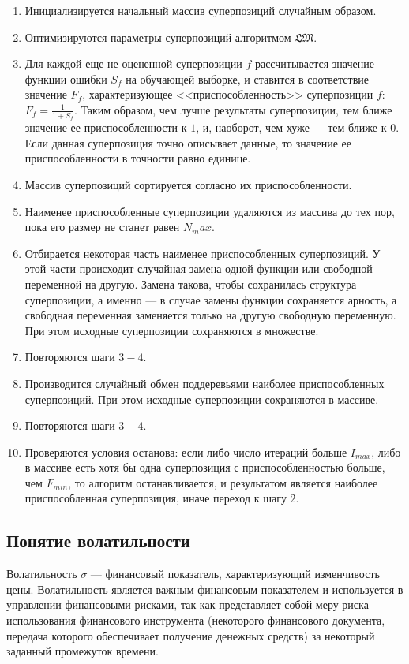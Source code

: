 \documentclass[12pt,a4paper]{amsart}
\begin{document}
\begin{enumerate}
  \item Инициализируется начальный массив суперпозиций случайным образом.
  \item Оптимизируются параметры суперпозиций алгоритмом $\mathfrak{LM}$.
  \item Для каждой еще не оцененной суперпозиции $f$ рассчитывается значение
	функции ошибки $S_f$ на обучающей выборке, и ставится в соответствие
	значение $F_f$, характеризующее <<приспособленность>> суперпозиции $f$:
	$F_f = \frac{1}{1 + S_f}$. Таким образом, чем лучше результаты суперпозиции,
	тем ближе значение ее приспособленности к $1$, и, наоборот, чем хуже ---
	тем ближе к $0$. Если данная суперпозиция точно описывает данные, то
	значение ее приспособленности в точности равно единице.
  \item Массив суперпозиций сортируется согласно их приспособленности.
  \item Наименее приспособленные суперпозиции удаляются из массива до тех
	пор, пока его размер не станет равен $N_max$.
  \item Отбирается некоторая часть наименее приспособленных суперпозиций.
	У этой части происходит случайная замена одной функции или свободной
	переменной на другую. Замена такова, чтобы сохранилась структура
	суперпозиции, а именно --- в случае замены функции сохраняется арность,
	а свободная переменная заменяется только на другую свободную переменную.
	При этом исходные суперпозиции сохраняются в множестве.
  \item Повторяются шаги $3-4$.
  \item Производится случайный обмен поддеревьями наиболее приспособленных
	суперпозиций. При этом исходные суперпозиции сохраняются в массиве.
  \item Повторяются шаги $3-4$.
  \item Проверяются условия останова: если либо число итераций больше
	$I_{max}$, либо в массиве есть хотя бы одна суперпозиция с
	приспособленностью больше, чем $F_{min}$, то алгоритм останавливается,
	и результатом является наиболее приспособленная суперпозиция, иначе
	переход к шагу $2$.
\end{enumerate}

\subsection{Понятие волатильности}

Волатильность $\sigma$ --- финансовый показатель, характеризующий
изменчивость цены. Волатильность является важным финансовым показателем
и используется в управлении финансовыми рисками, так как представляет собой
меру риска использования финансового инструмента (некоторого финансового
документа, передача которого обеспечивает получение денежных средств) за
некоторый заданный промежуток времени.
\end{document}

